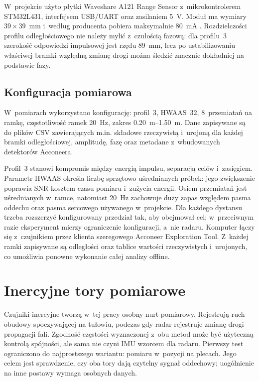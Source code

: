 \documentclass[12pt,a4paper,oneside]{report}
\begin{document}
W~projekcie użyto płytki Waveshare A121 Range Sensor z~mikrokontrolerem
STM32L431, interfejsem USB/UART oraz zasilaniem \SI{5}{V}. Moduł ma wymiary
$39\times39$~mm i~według producenta pobiera maksymalnie \SI{80}{mA}
\cite{waveshare_a121}. Rozdzielczości profilu odległościowego nie należy mylić
z~czułością fazową: dla profilu~3 szerokość odpowiedzi impulsowej jest rzędu
\SI{89}{mm}, lecz po ustabilizowaniu właściwej bramki względną zmianę drogi
można śledzić znacznie dokładniej na podstawie fazy.

\section{Konfiguracja pomiarowa}
W~pomiarach wykorzystano konfigurację: profil~3, HWAAS~32, 8~przemiatań na
ramkę, częstotliwość ramek \SI{20}{Hz}, zakres \SIrange{0.20}{1.50}{m}.
Dane zapisywane są do plików CSV zawierających m.in. składowe rzeczywistą
i~urojoną dla każdej bramki odległościowej, amplitudę, fazę oraz metadane
z~wbudowanych detektorów Acconeera.

Profil~3 stanowi kompromis między energią impulsu, separacją celów i~zasięgiem.
Parametr HWAAS określa liczbę sprzętowo uśrednianych próbek: jego zwiększenie
poprawia SNR kosztem czasu pomiaru i~zużycia energii. Osiem przemiatań jest
uśrednianych w~ramce, natomiast \SI{20}{Hz} zachowuje duży zapas względem pasma
oddechu oraz pasma sercowego używanego w~projekcie. Dla każdego dystansu trzeba
rozszerzyć konfigurowany przedział tak, aby obejmował cel; w~przeciwnym razie
eksperyment mierzy ograniczenie konfiguracji, a~nie radaru. Komputer łączy się
z~czujnikiem przez klienta szeregowego Acconeer Exploration Tool. Z~każdej
ramki zapisywane są odległości oraz tablice wartości rzeczywistych i~urojonych,
co umożliwia ponowne wykonanie całej analizy offline.

\chapter{Inercyjne tory pomiarowe}
\label{chap:imu}

Czujniki inercyjne tworzą w~tej pracy osobny nurt pomiarowy. Rejestrują ruch
obudowy spoczywającej na tułowiu, podczas gdy radar rejestruje zmianę drogi
propagacji fali. Zgodność częstości wyznaczonej z~obu metod może być użyteczną
kontrolą spójności, ale sama nie czyni IMU wzorcem dla radaru. Pierwszy test
ograniczono do najprostszego wariantu: pomiaru w~pozycji na plecach. Jego celem
jest sprawdzenie, czy oba tory dają czytelny sygnał oddechowy; uogólnienie na
inne postawy wymaga osobnych danych.
\end{document}

